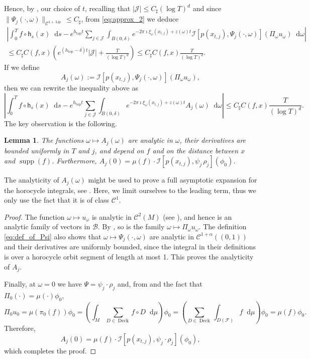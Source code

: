 \documentclass[11pt,letterpaper]{amsart}
\newcommand \cF {{\mathcal F}}
\newcommand \cB {{\mathscr B}}
\newcommand \sC {{C_\sharp}}
\newcommand{\horo}{\mathsf{h}}
\newcommand*{\diff}{\mathop{}\!\mathrm{d}}
\DeclareMathOperator{\topp}{top}
\DeclareMathOperator{\Deck}{Deck}
\DeclareMathOperator{\Lip}{Lip}
\DeclareMathOperator{\supp}{supp}
\newtheorem {lemma}[theorem]{Lemma}
\theoremstyle{definition}
\begin{document}
Hence, by , our choice of $t$, recalling that $|\mathcal{J}| \leq \sC (\log T)^d$ and since $\|\Psi_j(\cdot, \omega)\|_{\mathscr{C}^{1+\Lip}} \leq \sC$, from \eqref{eq:approx_2} we deduce
\begin{multline*}
\left\lvert \int_{0}^{T} f \circ \horo_s(x) \diff s - e^{h_{\topp}t} \sum_{j \in \mathcal{J}} \int_{B(0,\delta)} e^{- 2 \pi \imath \xi_{\omega}(x_{t,j}) + z(\omega) t } \mathcal{I}[p(x_{t,j}),\Psi_j(\cdot, \omega)]\left(\Pi_{\omega} u_\omega \right) \diff \omega \right\rvert \\ \leq \sC C(f,x) \left( e^{(h_{\topp}- \delta )t} |\mathcal{J}| + \frac{T}{(\log T)^d}\right) \leq \sC C(f,x) \frac{T}{(\log T)^d}. 
\end{multline*}
If we define 
\[
A_j(\omega) := \mathcal{I}[p(x_{t,j}),\Psi_j(\cdot, \omega)]\left(\Pi_{\omega} u_\omega \right),
\]
then we can rewrite the inequality above as 
\begin{equation}\label{eq:approx_4}
	\left\lvert \int_{0}^{T} f \circ \horo_s(x) \diff s -e^{h_{\topp}t} \sum_{j \in \mathcal{J}} \int_{B(0,\delta)} e^{- 2 \pi \imath \xi_{\omega}(x_{t,j}) +z(\omega) t } A_j(\omega) \diff \omega \right\rvert  \leq \sC C(f,x) \frac{T}{(\log T)^d}. 
\end{equation}
The key observation is the following.
\begin{lemma}\label{lem:smoothness_of_A}
	The functions $\omega \mapsto A_j(\omega)$ are analytic in $\omega$, their derivatives are bounded uniformly in $T$ and $j$, and depend on $f$ and on the distance between $x$ and $\supp(f)$. Furthermore, $A_j(0) = \mu(f) \cdot  \mathcal{I}[p(x_{t,j}),\psi_j \, \rho_j](\phi_0)$.
\end{lemma}
The analyticity of $A_j(\omega)$ might be used to prove a full asymptotic expansion for the horocycle integrals, see . Here, we limit ourselves to the leading term, thus we only use the fact that it is of class $\mathscr{C}^1$.
\begin{proof}
The function $\omega \mapsto u_\omega$ is analytic in $\mathscr{C}^2(M)$ (see ), and hence is an analytic family of vectors in $\cB$. By , so is the family $\omega \mapsto \Pi_\omega u_\omega$. The definition \eqref{eq:def_of_Psi} also shows that $\omega \mapsto \Psi_j(\cdot, \omega)$ are analytic in $\mathscr{C}^{1+\alpha}((0,1))$ and their derivatives are uniformly bounded, since the integral in their definitions is over a horocycle orbit segment of length at most 1. 
This proves the analyticity of $A_j$.

Finally, at $\omega=0$ we have $\Psi = \psi_j \cdot \rho_j$ and, from  and the fact that $\Pi_0(\cdot)=\mu(\cdot) \phi_0$,
\[
\Pi_0 u_0 = \mu(\pi_0(f)) \phi_0 =  \left( \int_M  \sum_{D \in \Deck} f\circ D \diff \mu\right) \phi_0 =\left(  \sum_{D \in \Deck} \int_{D(\cF)} f \diff \mu \right) \phi_0= \mu(f)\phi_0.
\]
Therefore,
\[
A_j(0) = \mu(f) \cdot \mathcal{I}[p(x_{t,j}), \psi_j \cdot \rho_j] (\phi_0),
\] 
which completes the proof.
\end{proof}
\end{document}
